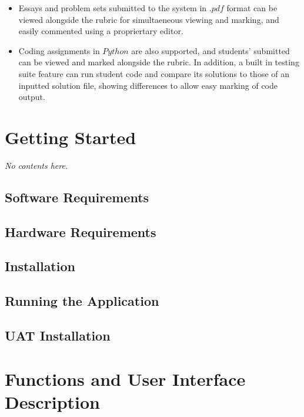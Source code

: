 \documentclass{article}
\begin{document}
\begin{itemize}
    \begin{itemize}
      \item Essays and problem sets submitted to the system in $.pdf$ format can be 
	viewed alongside the rubric for simultaeneous viewing and marking, and easily 
	commented using a propriertary editor. 
      \item Coding assignments in $Python$ are also supported, and students' submitted
	can be viewed and marked alongside the rubric. In addition, a built in testing
	suite feature can run student code and compare its solutions to those of an
	inputted solution file, showing differences to allow easy marking of code
	output.
    \end{itemize}
\end{itemize}

\section{Getting Started}
\emph{No contents here.}

\subsection{Software Requirements}

\subsection{Hardware Requirements}

\subsection{Installation}

\subsection{Running the Application}

\subsection{UAT Installation}

\section{Functions and User Interface Description}  %
\end{document}
